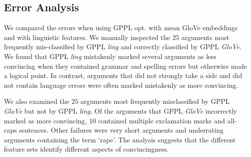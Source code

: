 \subsection{Error Analysis}

We compared the errors when using GPPL opt. with mean GloVe embeddings
and with linguistic features. We
manually inspected the $25$ arguments most frequently
mis-classified by GPPL \emph{ling} and correctly classified by GPPL \emph{GloVe}.
We found that GPPL \emph{ling} mistakenly marked several arguments 
as less convincing when they contained grammar and spelling errors but otherwise
made a logical point. 
In contrast, arguments that did not strongly take a side and did not contain 
language errors were often marked mistakenly as more convincing.

We also examined the $25$ arguments most frequently misclassified by GPPL \emph{GloVe} but not by GPPL \emph{ling}.
Of the arguments that GPPL \emph{GloVe} incorrectly marked as more convincing, 
$10$ contained multiple exclamation marks and all-caps sentences. 
Other failures were very short arguments and underrating arguments containing the term `rape'.
The analysis suggests that the different feature sets identify different aspects of convincingness.

